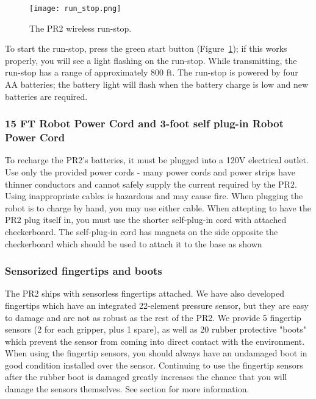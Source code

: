 \begin{figure}[h]
\centering
\texttt{[image: run\_stop.png]}
\caption{The PR2 wireless run-stop.}
\label{fig:runstop}
\end{figure}

To start the run-stop, press the green start button (Figure~\ref{fig:runstop}); if this works properly, you will see a 
light flashing on the run-stop. While transmitting, the run-stop has a range of approximately 800 ft. The run-stop is 
powered by four AA batteries; the battery light will flash when the battery charge is low and new batteries are required.

\subsubsection{15 FT Robot Power Cord and 3-foot self plug-in Robot Power Cord}
To recharge the PR2's batteries, it must be plugged into a 120V electrical outlet.  Use only the provided power cords - many power cords and power strips have thinner conductors and cannot safely supply the current required by the PR2.  Using inappropriate cables is hazardous and may cause fire.  When plugging the robot is to charge by hand, you may use either cable.  When attepting to have the PR2 plug itself in, you must use the shorter self-plug-in cord with attached checkerboard.  The self-plug-in cord has magnets on the side opposite the checkerboard which should be used to attach it to the base as shown 

\subsubsection{Sensorized fingertips and boots}
The PR2 ships with sensorless fingertips attached.  We have also developed fingertips which have an integrated 22-element pressure sensor, but they are easy to damage and are not as robust as the rest of the PR2.  We provide 5 fingertip sensors (2 for each gripper, plus 1 spare), as well as 20 rubber protective "boots" which prevent the sensor from coming into direct contact with the environment.  When using the fingertip sensors, you should always have an undamaged boot in good condition installed over the sensor.  Continuing to use the fingertip sensors after the rubber boot is damaged greatly increases the chance that you will damage the sensors themselves.  See section  for more information.

